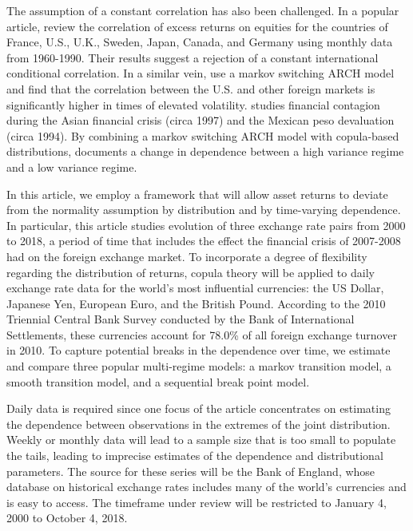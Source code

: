 \documentclass[12pt]{article}
\begin{document}
The assumption of a constant correlation has also been challenged. In a popular article, \cite{Longin_and_Solnik_1995} review the correlation of excess returns on equities for the countries of France, U.S., U.K., Sweden, Japan, Canada, and Germany using monthly data from 1960-1990. Their results suggest a rejection of a constant international conditional correlation. In a similar vein, \cite{Ramchand_and_Susmel_1998} use a markov switching ARCH model and find that the correlation between the U.S. and other foreign markets is significantly higher in times of elevated volatility. \cite{Rodriguez_2007} studies financial contagion during the Asian financial crisis (circa 1997) and the Mexican peso devaluation (circa 1994). By combining a markov switching ARCH model with copula-based distributions, \cite{Rodriguez_2007} documents a change in dependence between a high variance regime and a low variance regime.

In this article, we employ a framework that will allow asset returns to deviate from the normality assumption by distribution and by time-varying dependence. In particular, this article studies evolution of three exchange rate pairs from 2000 to 2018, a period of time that includes the effect the financial crisis of 2007-2008 had on the foreign exchange market. To incorporate a degree of flexibility regarding the distribution of returns, copula theory will be applied to daily exchange rate data for the world's most influential currencies: the US Dollar, Japanese Yen, European Euro, and the British Pound. According to the 2010 Triennial Central Bank Survey conducted by the Bank of International Settlements, these currencies account for 78.0\% of all foreign exchange turnover in 2010. To capture potential breaks in the dependence over time, we estimate and compare three popular multi-regime models: a markov transition model, a smooth transition model, and a sequential break point model.

Daily data is required since one focus of the article concentrates on estimating the dependence between observations in the extremes of the joint distribution. Weekly or monthly data will lead to a sample size that is too small to populate the tails, leading to imprecise estimates of the dependence and distributional parameters. The source for these series will be the Bank of England, whose database on historical exchange rates includes many of the world's currencies and is easy to access. The timeframe under review will be restricted to January 4, 2000 to October 4, 2018.
\end{document}
